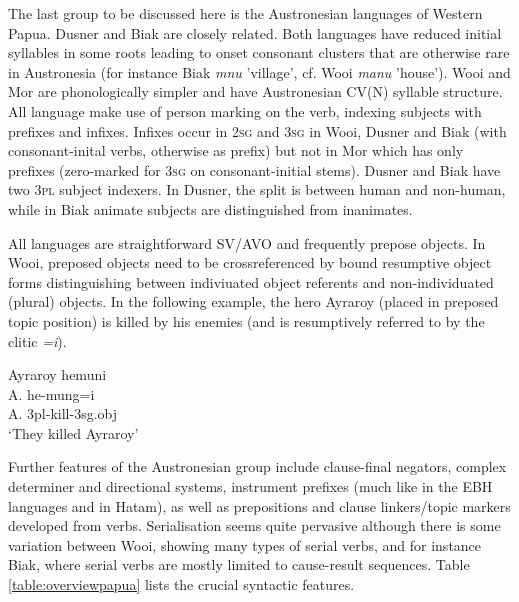 The last group to be discussed here is the Austronesian languages of Western Papua. Dusner and Biak are closely related. Both languages have reduced initial syllables in some roots leading to onset consonant clusters that are otherwise rare in Austronesia (for instance Biak \textit{mnu} 'village', cf. Wooi \textit{manu} 'house'). Wooi and Mor are phonologically simpler and have Austronesian CV(N) syllable structure. All language make use of person marking on the verb, indexing subjects with prefixes and infixes. Infixes occur in \textsc{2sg} and \textsc{3sg} in Wooi, Dusner and Biak (with consonant-inital verbs, otherwise as prefix) but not in Mor which has only prefixes (zero-marked for \textsc{3sg} on consonant-initial stems). Dusner and Biak have two \textsc{3pl} subject indexers. In Dusner, the split is between human and non-human, while in Biak animate subjects are distinguished from inanimates.

All languages are straightforward SV/AVO and frequently prepose objects. In Wooi, preposed objects need to be crossreferenced by bound resumptive object forms distinguishing between indiviuated object referents and non-individuated (plural) objects. In the following example, the hero Ayraroy (placed in preposed topic position) is killed by his enemies (and is resumptively referred to by the clitic \textit{=i}).

\ea 
\gll Ayraroy hemuni \\
A. he-mung=i \\
\glc A. \acs{3}\acs{pl}-kill-\acs{3}\acs{sg}.\acs{obj} \\
\glft `They killed Ayraroy' \\ 
\endgl
\xe

Further features of the Austronesian group include clause-final negators, complex determiner and directional systems, instrument prefixes (much like in the EBH languages and in Hatam), as well as prepositions and clause linkers/topic markers developed from verbs. Serialisation seems quite pervasive although there is some variation between Wooi, showing many types of serial verbs, and for instance Biak, where serial verbs are mostly limited to cause-result sequences. Table \ref{table:overviewpapua} lists the crucial syntactic features.

